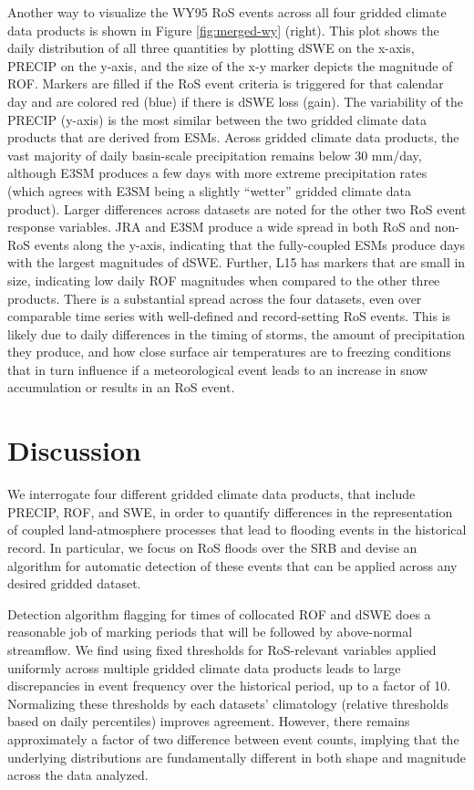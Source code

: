 \documentclass[draft]{agujournal2019}
\begin{document}
Another way to visualize the WY95 RoS events across all four gridded climate data products is shown in Figure \ref{fig:merged-wy} (right).  This plot shows the daily distribution of all three quantities by plotting dSWE on the x-axis, PRECIP on the y-axis, and the size of the x-y marker depicts the magnitude of ROF.
Markers are filled if the RoS event criteria is triggered for that calendar day and are colored red (blue) if there is dSWE loss (gain). 
The variability of the PRECIP (y-axis) is the most similar between the two gridded climate data products that are derived from ESMs.
Across gridded climate data products, the vast majority of daily basin-scale precipitation remains below 30 mm/day, although E3SM produces a few days with more extreme precipitation rates (which agrees with E3SM being a slightly ``wetter'' gridded climate data product). 
Larger differences across datasets are noted for the other two RoS event response variables. 
JRA and E3SM produce a wide spread in both RoS and non-RoS events along the y-axis, indicating that the fully-coupled ESMs produce days with the largest magnitudes of dSWE. 
Further, L15 has markers that are small in size, indicating low daily ROF magnitudes when compared to the other three products.
There is a substantial spread across the four datasets, even over comparable time series with well-defined and record-setting RoS events.
This is likely due to daily differences in the timing of storms, the amount of precipitation they produce, and how close surface air temperatures are to freezing conditions that in turn influence if a meteorological event leads to an increase in snow accumulation or results in an RoS event.

\section{Discussion}

We interrogate four different gridded climate data products, that include PRECIP, ROF, and SWE, in order to quantify differences in the representation of coupled land-atmosphere processes that lead to flooding events in the historical record.
In particular, we focus on RoS floods over the SRB and devise an algorithm for automatic detection of these events that can be applied across any desired gridded dataset. 

Detection algorithm flagging for times of collocated ROF and dSWE does a reasonable job of marking periods that will be followed by above-normal streamflow. 
We find using fixed thresholds for RoS-relevant variables applied uniformly across multiple gridded climate data products leads to large discrepancies in event frequency over the historical period, up to a factor of 10. 
Normalizing these thresholds by each datasets' climatology (relative thresholds based on daily percentiles) improves agreement. 
However, there remains approximately a factor of two difference between event counts, implying that the underlying distributions are fundamentally different in both shape and magnitude across the data analyzed.
\end{document}

